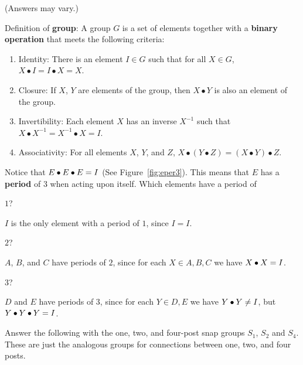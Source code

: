 \documentclass[../gatm_answers.tex]{subfiles}
\begin{document}
(Answers may vary.)

Definition of \textbf{group}: A group $G$ is a set of elements together with a \textbf{binary operation} that meets the following criteria:
\begin{enumerate}[label=(\alph*)]
\item Identity: There is an element $I\in G$ such that for all $X\in G$, $X\bullet I = I\bullet X = X$.
\item Closure: If $X$, $Y$ are elements of the group, then $X\bullet Y$ is also an element of the group.
\item Invertibility: Each element $X$ has an inverse $X^{-1}$ such that $X\bullet X^{-1} = X^{-1}\bullet X = I$.
\item Associativity: For all elements $X$, $Y$, and $Z$, $X\bullet (Y\bullet Z) = (X\bullet Y) \bullet Z$.
\end{enumerate}

\begin{outer_problem}
	\item Notice that $E\bullet E\bullet E=I$ (See Figure~\ref{fig:eper3}). This means that $E$ has a \textbf{period} of $3$ when acting upon itself. Which elements have a period of
\end{outer_problem}

\begin{inner_problem}[start=1]
	 \item $1$?
\end{inner_problem}

$I$ is the only element with a period of $1$, since $I=I$.

\begin{inner_problem}
	 \item $2$?
\end{inner_problem}

$A$, $B$, and $C$ have periods of $2$, since for each $X\in{A,B,C}$ we have $X\bullet X = I$.

\begin{inner_problem}
	 \item $3$?
\end{inner_problem}

$D$ and $E$ have periods of $3$, since for each $Y\in {D,E}$ we have $Y\bullet Y\neq I$, but $Y\bullet Y\bullet Y=I$.

\begin{outer_problem}
	\item Answer the following with the one, two, and four-post snap groups $S_1$, $S_2$ and $S_4$. These are just the analogous groups for connections between one, two, and four posts.
\end{outer_problem}
\end{document}
